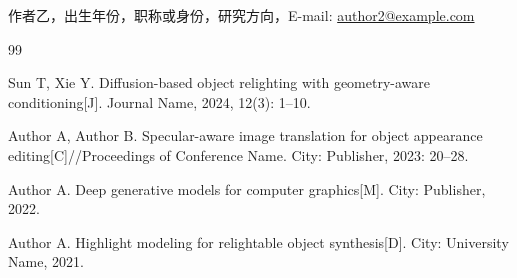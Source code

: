 \documentclass[UTF8,a4paper]{ctexart}
\begin{document}
\noindent 作者乙，出生年份，职称或身份，研究方向，E-mail: \href{mailto:author2@example.com}{author2@example.com}

\begin{thebibliography}{99}

Sun T, Xie Y. Diffusion-based object relighting with geometry-aware conditioning[J]. Journal Name, 2024, 12(3): 1--10.

Author A, Author B. Specular-aware image translation for object appearance editing[C]//Proceedings of Conference Name. City: Publisher, 2023: 20--28.

Author A. Deep generative models for computer graphics[M]. City: Publisher, 2022.

Author A. Highlight modeling for relightable object synthesis[D]. City: University Name, 2021.

\end{thebibliography}
\end{document}
